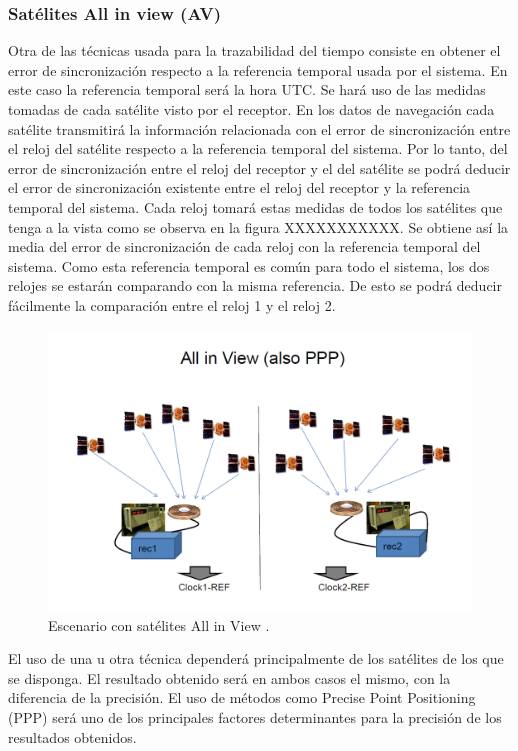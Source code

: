 \subsubsection{Satélites All in view (AV)}
Otra de las técnicas usada para la trazabilidad del tiempo consiste en obtener el error de sincronización respecto a la referencia temporal usada por el sistema. En este caso la referencia temporal será la hora UTC. Se hará uso de las medidas tomadas de cada satélite visto por el receptor. En los datos de navegación cada satélite transmitirá la información relacionada con el error de sincronización entre el reloj del satélite respecto a la referencia temporal del sistema. Por lo tanto, del error de sincronización entre el reloj del receptor y el del satélite se podrá deducir el error de sincronización existente entre el reloj del receptor y la referencia temporal del sistema. Cada reloj tomará estas medidas de todos los satélites que tenga a la vista como se observa en la figura XXXXXXXXXXX. Se obtiene así la media del error de sincronización de cada reloj con la referencia temporal del sistema. Como esta referencia temporal es común para todo el sistema, los dos relojes se estarán comparando con la misma referencia. De esto se podrá deducir fácilmente la comparación entre el reloj 1 y el reloj 2.\newline

\begin{figure}
	\centering
	\includegraphics[width=1\textwidth]{imagenes/allinview.PNG}
	\caption{\label{fig1}Escenario con satélites All in View \cite{timetransfer}.}
\end{figure}

El uso de una u otra técnica dependerá principalmente de los satélites de los que se disponga. El resultado obtenido será en ambos casos el mismo, con la diferencia de la precisión. El uso de métodos como Precise Point Positioning (PPP) será uno de los principales factores determinantes para la precisión de los resultados obtenidos.\newline

